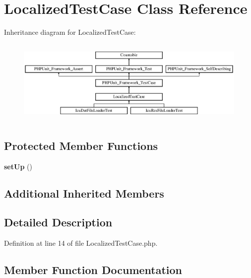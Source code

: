 \section{Localized\+Test\+Case Class Reference}
\label{class_symfony_1_1_component_1_1_translation_1_1_tests_1_1_loader_1_1_localized_test_case}
Inheritance diagram for Localized\+Test\+Case\+:\begin{figure}[H]
\begin{center}
\leavevmode
\includegraphics[height=4.129793cm]{class_symfony_1_1_component_1_1_translation_1_1_tests_1_1_loader_1_1_localized_test_case}
\end{center}
\end{figure}
\subsection*{Protected Member Functions}
\begin{DoxyCompactItemize}
\item 
{\bf set\+Up} ()
\end{DoxyCompactItemize}
\subsection*{Additional Inherited Members}


\subsection{Detailed Description}


Definition at line 14 of file Localized\+Test\+Case.\+php.



\subsection{Member Function Documentation}
